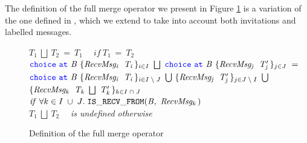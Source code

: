 \documentclass[12pt,twoside]{report}
\begin{document}
The definition of the full merge operator we present in Figure \ref{fullmerge} is a variation of the one defined in \cite{featherweight}, which we extend to take into account both invitations and labelled messages.\\

\begin{figure}[h]

    \centering

    $\mathit{T_1}\ \bigsqcup\ \mathit{T_2}\ =\ \mathit{T_1} \quad \; \mathit{if}\ \mathit{T_1}\ =\ \mathit{T_2}$\\[25pt]

    $\choice\ \at\ \mathit{B}\ \{\mathit{RecvMsg_i}\ \;\mathit{T_i}\,\}_\varinset{i}{I}\ \bigsqcup\ \choice\ \at\ \mathit{B}\ \{\mathit{RecvMsg_j}\ \;\mathit{T'_j}\,\}_\varinset{j}{J}\ =$\\[5pt]
    $\choice\ \at\ \mathit{B}\ \{\mathit{RecvMsg_i}\ \;\mathit{T_i}\,\}_\varinset{i}{I\;\setminus\;J}\ \bigcup\ \{\mathit{RecvMsg_j}\ \;\mathit{T'_j}\,\}_\varinset{j}{J\;\setminus\;I}\ \bigcup$\\
     $\{\mathit{RecvMsg_k}\;\ \mathit{T_k}\ \bigsqcup\ \mathit{T'_k}\,\}_\varinset{k}{I\;\cap\;J}$\\[7.5pt]


    $\mathit{if}\ \forall \varinset{k}{I\;\cup\;J}.\;\mathtt{IS\_RECV\_FROM}(\mathit{B},\ \mathit{RecvMsg_k\,})$\\[25pt]




     $\mathit{T_1}\ \bigsqcup\ \mathit{T_2}$ \ \ \textit{is undefined otherwise}\\[7.5pt]

    \caption{Definition of the full merge operator}
    \label{fullmerge}
\end{figure}
\end{document}
